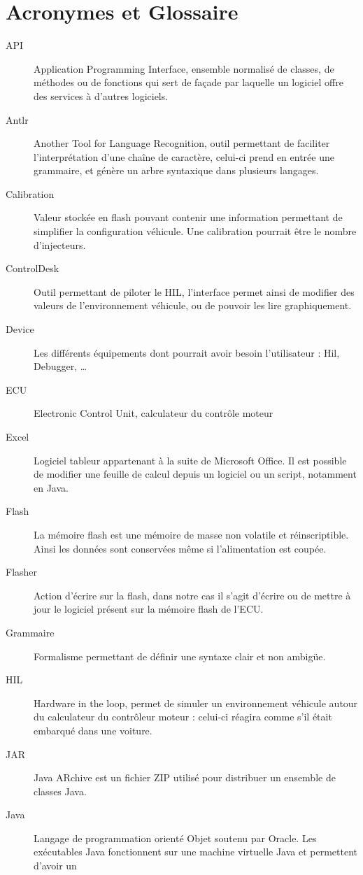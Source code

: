 \chapter{Acronymes et Glossaire}
\begin{description}
\item[API] Application Programming Interface, ensemble normalisé de classes, de méthodes ou de fonctions qui sert de façade par laquelle un
	logiciel offre des services à d'autres logiciels.
\item[Antlr] Another Tool for Language Recognition, outil permettant de faciliter l'interprétation d'une chaîne de caractère, celui-ci prend en entrée une
	grammaire, et génère un arbre syntaxique dans plusieurs langages.
\item[Calibration] Valeur stockée en flash pouvant contenir une information permettant de simplifier la configuration véhicule. Une
	calibration pourrait être le nombre d'injecteurs.
\item[ControlDesk] Outil permettant de piloter le HIL, l'interface permet ainsi de modifier des valeurs de l'environnement véhicule, ou de
	pouvoir les lire graphiquement.
\item[Device] Les différents équipements dont pourrait avoir besoin l'utilisateur : Hil, Debugger, \ldots 
\item[ECU] Electronic Control Unit, calculateur du contrôle moteur
\item[Excel] Logiciel tableur appartenant à la suite de Microsoft Office\textregistered. Il est possible de modifier une feuille de calcul depuis un logiciel ou un script, notamment en Java. 
\item[Flash] La mémoire flash est une mémoire de masse non volatile et réinscriptible. Ainsi les données sont conservées même si l'alimentation est coupée.
\item[Flasher] Action d'écrire sur la flash, dans notre cas il s'agit d'écrire ou de mettre à jour le logiciel présent sur la mémoire flash de l'ECU.
\item[Grammaire] Formalisme permettant de définir une syntaxe clair et non ambigüe.
\item[HIL] Hardware in the loop, permet de simuler un environnement véhicule autour du calculateur du contrôleur moteur : celui-ci réagira comme s'il était embarqué dans une voiture.
\item[JAR] Java ARchive est un fichier ZIP utilisé pour distribuer un ensemble de classes Java.
\item[Java] Langage de programmation orienté Objet soutenu par Oracle. Les exécutables Java fonctionnent sur une machine virtuelle Java et permettent d'avoir un

\end{description}

